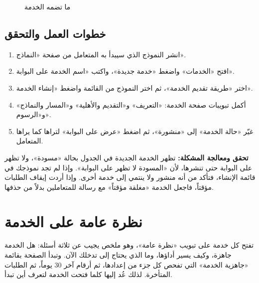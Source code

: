 \begin{figure}[H]
\centering
{}
\rclegend
\caption{ما تضمه الخدمة}
\label{fig:builder-services-model}
\end{figure}

\subsection{خطوات العمل والتحقق}
\begin{enumerate}
\item انشر النموذج الذي سيبدأ به المتعامل من صفحة «النماذج».
\item افتح «الخدمات» واضغط «خدمة جديدة»، واكتب «اسم الخدمة على البوابة».
\item اختر «طريقة تقديم الخدمة»، ثم اختر النموذج من القائمة واضغط «إنشاء الخدمة».
\item أكمل تبويبات صفحة الخدمة: «التعريف» و«التقديم والأهلية» و«المسار والنماذج» و«الرسوم».
\item غيّر «حالة الخدمة» إلى «منشورة»، ثم اضغط «عرض على البوابة» لتراها كما يراها المتعامل.
\end{enumerate}

\textbf{تحقق ومعالجة المشكلة:} تظهر الخدمة الجديدة في الجدول بحالة «مسودة»، ولا تظهر على البوابة حتى تنشرها، لأن «المسودة لا تظهر على البوابة». وإذا لم تجد نموذجك في قائمة الإنشاء، فتأكد من أنه منشور ولا ينتمي إلى خدمة أخرى. وإذا أردت إيقاف الطلبات مؤقتاً، فاجعل الخدمة «مغلقة مؤقتاً» مع رسالة للمتعاملين بدلاً من حذفها.

\clearpage
\section{نظرة عامة على الخدمة}
\label{sec:builder-feature-services-overview}

تفتح كل خدمة على تبويب «نظرة عامة»، وهو ملخص يجيب عن ثلاثة أسئلة: هل الخدمة جاهزة، وكيف يسير أداؤها، وما الذي يحتاج إلى تدخلك الآن. وتبدأ الصفحة بقائمة «جاهزية الخدمة» التي تفحص كل جزء من إعدادها، ثم أرقام آخر 30 يوماً، ثم الطلبات المتأخرة. لذلك عُد إليها كلما فتحت الخدمة لتعرف أين تبدأ.


